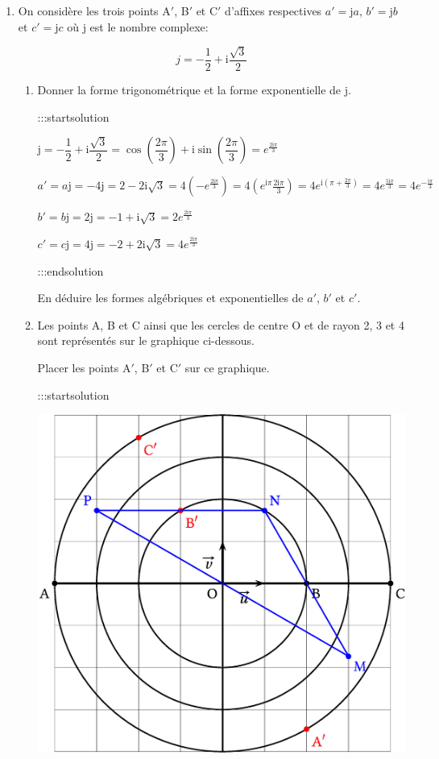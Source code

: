 \documentclass{cornouaille}
\begin{document}
\begin{enumerate}
\item On considère les trois points A$'$, B$'$ et C$'$ d'affixes respectives $a'= \text{j}a$, $b'= \text{j}b$ et $c'= \text{j}c$ où j est le nombre complexe:

$$
j=-\dfrac{1}{2} + \text{i}\dfrac{\sqrt{3}}{2}
$$


\begin{enumerate}
\item Donner la forme trigonométrique et la forme exponentielle de j.


:::startsolution

$\text{j}=-\dfrac{1}{2} + \text{i}\dfrac{\sqrt{3}}{2}=\cos\left(\dfrac{2\pi}{3}\right) + \text{i}\sin\left(\dfrac{2\pi}{3}\right)=e^{\frac{2\text{i}\pi}{3}}$

$a'=a\text{j}=-4\text{j}=2-2\text{i}\sqrt{3}=4\left( -e^{\frac{2\text{i}\pi}{3}}\right)=4\left( e^{\text{i}\pi}{\frac{2\text{i}\pi}{3}}\right)=4e^{\text{i}\left( \pi+\frac{2\pi}{3}\right)  }=4e^{\frac{5\text{i}\pi}{3}}=4e^{-\frac{\text{i}\pi}{3}}$

$b'= b\text{j}=2\text{j}=-1+\text{i}\sqrt{3}=2e^{\frac{2\text{i}\pi}{3}}$

$c'= c\text{j}=4\text{j}=-2+2\text{i}\sqrt{3}=4e^{\frac{2\text{i}\pi}{3}}$


:::endsolution

En déduire les formes algébriques et exponentielles de $a'$, $b'$ et $c'$.
\item Les points A, B et C ainsi que les cercles de centre O et de rayon 2, 3 et 4 sont
représentés sur le graphique ci-dessous.

Placer les points A$'$, B$'$ et C$'$ sur ce graphique.


:::startsolution




\includegraphics{./TS-Complexes-Loga-0}




\end{enumerate}
\end{enumerate}
\end{document}
